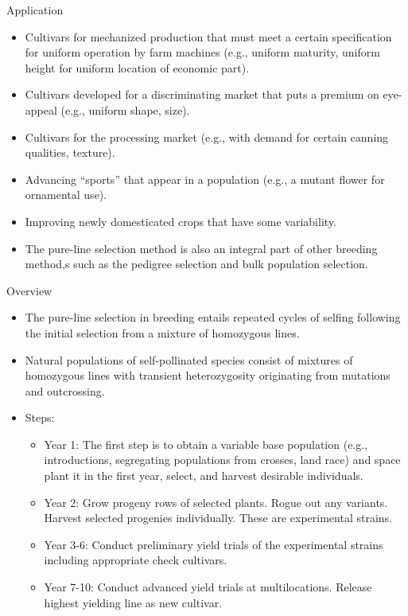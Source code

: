\documentclass[11pt,dvipsnames,ignorenonframetext,aspectratio=169]{beamer}
\providecommand{\tightlist}{%
  \setlength{\itemsep}{0pt}\setlength{\parskip}{0pt}}
\begin{document}
\begin{frame}{Application}
\protect\hypertarget{application}{}
\begin{itemize}
\tightlist
\item
  Cultivars for mechanized production that must meet a certain
  specification for uniform operation by farm machines (e.g., uniform
  maturity, uniform height for uniform location of economic part).
\item
  Cultivars developed for a discriminating market that puts a premium on
  eye-appeal (e.g., uniform shape, size).
\item
  Cultivars for the processing market (e.g., with demand for certain
  canning qualities, texture).
\item
  Advancing ``sports'' that appear in a population (e.g., a mutant
  flower for ornamental use).
\item
  Improving newly domesticated crops that have some variability.
\item
  The pure-line selection method is also an integral part of other
  breeding method,s such as the pedigree selection and bulk population
  selection.
\end{itemize}
\end{frame}

\begin{frame}{Overview}
\protect\hypertarget{overview}{}
\begin{itemize}
\tightlist
\item
  The pure-line selection in breeding entails repeated cycles of selfing
  following the initial selection from a mixture of homozygous lines.
\item
  Natural populations of self-pollinated species consist of mixtures of
  homozygous lines with transient heterozygosity originating from
  mutations and outcrossing.
\item
  Steps:

  \begin{itemize}
  \tightlist
  \item
    Year 1: The first step is to obtain a variable base population
    (e.g., introductions, segregating populations from crosses, land
    race) and space plant it in the first year, select, and harvest
    desirable individuals.
  \item
    Year 2: Grow progeny rows of selected plants. Rogue out any
    variants. Harvest selected progenies individually. These are
    experimental strains.
  \item
    Year 3-6: Conduct preliminary yield trials of the experimental
    strains including appropriate check cultivars.
  \item
    Year 7-10: Conduct advanced yield trials at multilocations. Release
    highest yielding line as new cultivar.
  \end{itemize}
\end{itemize}
\end{frame}
\end{document}
